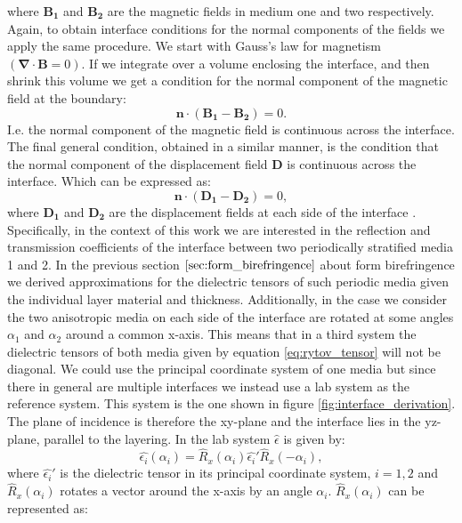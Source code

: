 where $\bm{B_1}$ and $\bm{B_2}$ are the magnetic fields in medium one and two respectively.
Again, to obtain interface conditions for the normal components of the fields we apply the same procedure. We start with Gauss's law for magnetism $(\bm{\nabla}\cdot \bm{B} = 0)$. If we integrate over a volume enclosing the interface, and then shrink this volume we get a condition for the normal component of the magnetic field at the boundary:
\begin{equation}
    \label{eq:n_boundary_cond_b}
    \bm{n}\cdot(\bm{B_1}-\bm{B_2}) = 0.
\end{equation}
I.e. the normal component of the magnetic field is continuous across the interface. The final general condition, obtained in a similar manner, is the condition that the normal component of the displacement field $\bm{D}$ is continuous across the interface. Which can be expressed as:
\begin{equation}
    \label{eq:n_boundary_cond_d}
    \bm{n}\cdot(\bm{D_1}-\bm{D_2}) = 0,
\end{equation}
where $\bm{D_1}$ and $\bm{D_2}$ are the displacement fields at each side of the interface \cite{Griffiths2017IntroductionElectrodynamics}. Specifically, in the context of this work we are interested in the reflection and transmission coefficients of the interface between two periodically stratified media 1 and 2. In the previous section $\ref{sec:form_birefringence}$ about form birefringence we derived approximations for the dielectric tensors of such periodic media given the individual layer material and thickness. Additionally, in the case we consider the two anisotropic media on each side of the interface are rotated at some angles $\alpha_1$ and $\alpha_2$ around a common x-axis. This means that in a third system the dielectric tensors of both media given by equation \ref{eq:rytov_tensor} will not be diagonal. We could use the principal coordinate system of one media but since there in general are multiple interfaces we instead use a lab system as the reference system. This system is the one shown in figure \ref{fig:interface_derivation}. The plane of incidence is therefore the xy-plane and the interface lies in the yz-plane, parallel to the layering. In the lab system $\hat{\epsilon}$ is given by:
\begin{equation}
    \label{eq:lab_epsilon}
    \hat{\epsilon_i}(\alpha_i) = \hat{R}_x(\alpha_i) \hat{\epsilon_i}' \hat{R}_x(-\alpha_i),
\end{equation}
where $\hat{\epsilon_i}'$ is the dielectric tensor in its principal coordinate system, $i=1,2$ and $\hat{R}_x(\alpha_i)$ rotates a vector around the x-axis by an angle $\alpha_i$. $\hat{R}_x(\alpha_i)$ can be represented as:
